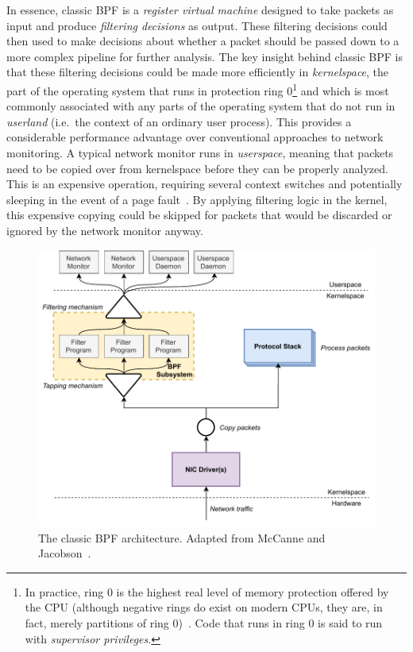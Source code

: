 In essence, classic BPF is a \textit{register virtual machine} designed to take packets
as input and produce \textit{filtering decisions} as output. These filtering decisions
could then used to make decisions about whether a packet should be passed down to a more
complex pipeline for further analysis. The key insight behind classic BPF is that these
filtering decisions could be made more efficiently in \textit{kernelspace}, the part of
the operating system that runs in protection ring 0\footnote{In practice, ring 0 is the
highest real level of memory protection offered by the CPU (although negative rings do
exist on modern CPUs, they are, in fact, merely partitions of ring 0)~. Code
that runs in ring 0 is said to run with \textit{supervisor privileges}.} and which is most
commonly associated with any parts of the operating system that do not run in
\textit{userland} (i.e.~the context of an ordinary user process). This provides
a considerable performance advantage over conventional approaches to network monitoring.
A typical network monitor runs in \textit{userspace}, meaning that packets need to be
copied over from kernelspace before they can be properly analyzed. This is an expensive
operation, requiring several context switches and potentially sleeping in the event of
a page fault~\cite{mccanne1993_bpf}. By applying filtering logic in the kernel, this
expensive copying could be skipped for packets that would be discarded or ignored by the
network monitor anyway.

\begin{figure}[tbp]
  \centering
  \includegraphics[width=0.8\linewidth]{figs/background/classic-bpf.pdf}
  \caption[The classic BPF architecture]{The classic BPF architecture. Adapted from McCanne and Jacobson~\cite{mccanne1993_bpf}.}%
  \label{fig:classic-bpf}
\end{figure}

